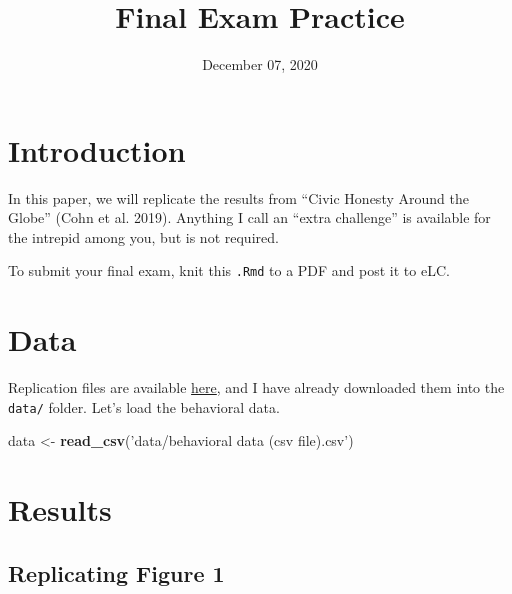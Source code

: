 \documentclass[12pt,halfline,a4paper,]{ouparticle}
\newenvironment{Shaded}{\begin{snugshade}}{\end{snugshade}}
\newcommand{\KeywordTok}[1]{\textcolor[rgb]{0.13,0.29,0.53}{\textbf{#1}}}
\newcommand{\NormalTok}[1]{#1}
\newcommand{\StringTok}[1]{\textcolor[rgb]{0.31,0.60,0.02}{#1}}
\begin{document}
\title{Final Exam Practice}

\author{%
\address{University of Georgia}
\and
{}\address{University of Georgia}
}

\abstract{}

\date{December 07, 2020}

\keywords{}

\maketitle



\hypertarget{introduction}{%
\section{Introduction}\label{introduction}}

In this paper, we will replicate the results from ``Civic Honesty Around
the Globe'' (Cohn et al. 2019). Anything I call an ``extra challenge''
is available for the intrepid among you, but is not required.

To submit your final exam, knit this \texttt{.Rmd} to a PDF and post it
to eLC.

\hypertarget{data}{%
\section{Data}\label{data}}

Replication files are available
\href{https://dataverse.harvard.edu/dataverse/honesty}{here}, and I have
already downloaded them into the \texttt{data/} folder. Let's load the
behavioral data.

\begin{Shaded}
\begin{Highlighting}[]
\NormalTok{data <-}\StringTok{ }\KeywordTok{read_csv}\NormalTok{(}\StringTok{'data/behavioral data (csv file).csv'}\NormalTok{)}
\end{Highlighting}
\end{Shaded}

\hypertarget{results}{%
\section{Results}\label{results}}

\hypertarget{replicating-figure-1}{%
\subsection{Replicating Figure 1}\label{replicating-figure-1}}
\end{document}
